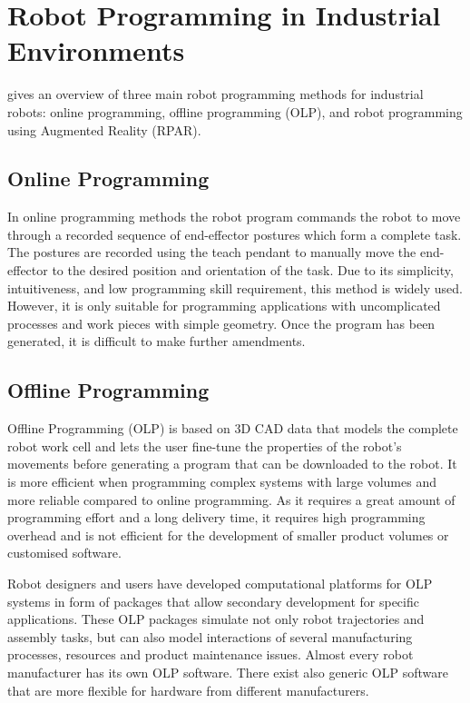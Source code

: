 \section{Robot Programming in Industrial Environments}\label{subsec:RP in Industrial Enviroments}
\cite{pan2012recent} gives an overview of three main robot programming methods for industrial robots: online programming, offline programming (OLP), and robot programming using Augmented Reality (RPAR). 

\subsection{Online Programming}\label{sssec:Online Programming}
In online programming methods the robot program commands the robot to move through a recorded sequence of end-effector postures which form a complete task. 
The postures are recorded using the teach pendant to manually move the end-effector to the desired position and orientation of the task. 
Due to its simplicity, intuitiveness, and low programming skill requirement, this method is widely used. 
However, it is only suitable for programming applications with uncomplicated processes and work pieces with simple geometry. 
Once the program has been generated, it is difficult to make further amendments.

\subsection{Offline Programming}\label{sssec:Offline Programming}
Offline Programming (OLP) is based on 3D CAD data that models the complete robot work cell and lets the user fine-tune the properties of the robot's movements before generating a program that can be downloaded to the robot. 
It is more efficient when programming complex systems with large volumes and more reliable compared to online programming. 
As it requires a great amount of programming effort and a long delivery time, it requires high programming overhead and is not efficient for the development of smaller product volumes or customised software.

Robot designers and users have developed computational platforms for OLP systems in form of packages that allow secondary development for specific applications. 
These OLP packages simulate not only robot trajectories and assembly tasks, but can also model interactions of several manufacturing processes, resources and product maintenance issues. 
Almost every robot manufacturer has its own OLP software. 
There exist also generic OLP software that are more flexible for hardware from different manufacturers.

